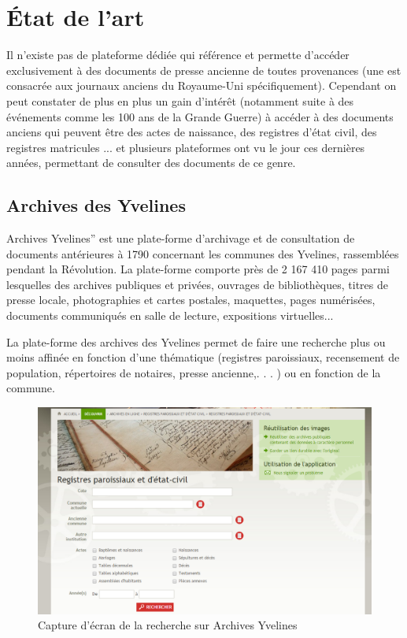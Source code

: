 \section{État de l'art}
\label{sec:etat_art}
    Il n’existe pas de plateforme dédiée qui référence et permette d’accéder exclusivement à des documents de presse ancienne de toutes
    provenances (une est consacrée aux journaux anciens du Royaume-Uni spécifiquement). Cependant
    on peut constater de plus en plus un gain d’intérêt (notamment suite à des événements comme les 100 ans de la Grande Guerre)
    à accéder à des documents anciens qui peuvent être des actes de naissance, des registres d’état civil, des registres matricules ...
    et plusieurs plateformes ont vu le jour ces dernières années, permettant de consulter des documents de ce genre.


        \subsection{Archives des Yvelines}
        \label{subsec:yvelines}
        Archives Yvelines” est une plate-forme d’archivage et de consultation de documents antérieures à 1790
        concernant les communes des Yvelines, rassemblées pendant la Révolution. La plate-forme comporte près
        de 2 167 410 pages parmi lesquelles des archives publiques et privées, ouvrages de bibliothèques, titres de presse locale,
        photographies et cartes postales, maquettes, pages numérisées, documents communiqués en salle de lecture, expositions virtuelles...

        La plate-forme des archives des Yvelines permet de faire une recherche plus ou moins affinée en fonction d’une thématique
        (registres paroissiaux, recensement de population, répertoires de notaires, presse ancienne,. . . ) ou en fonction de la commune.

        \begin{figure}[H]
            \centering
            \includegraphics[width=1\textwidth]{figure/screen_yvelines_recherche.png}
            \caption{Capture d'écran de la recherche sur Archives Yvelines}
            \label{fig:yvelines_recherche}
        \end{figure}

